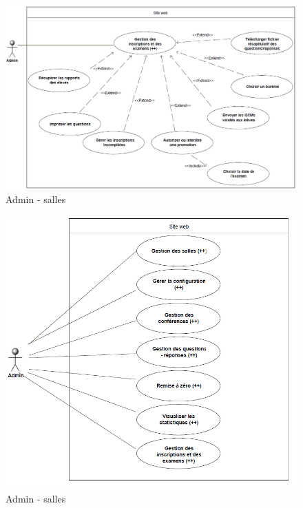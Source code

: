     \begin{figure}[h]
        \begin{center}
            \includegraphics[scale=0.50]{images/uml/adminInscriptionsExamens.png} 
        \end{center}

        \caption{Admin - salles}
        \label{Admin - salles}
    \end{figure}


    \begin{figure}[h]
        \begin{center}
            \includegraphics[scale=0.50]{images/uml/adminMenu.png} 
        \end{center}

        \caption{Admin - salles}
        \label{Admin - salles}
    \end{figure}

